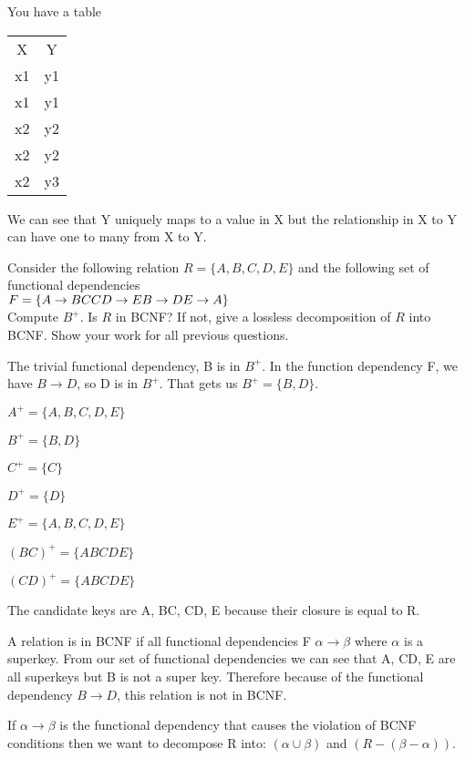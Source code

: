 \documentclass[a4 paper]{article}
\begin{document}
You have a table 

\begin{tabular}{c c}
    X & Y \\
    x1 & y1 \\
    x1 & y1 \\
    x2 & y2 \\
    x2 & y2 \\
    x2 & y3 \\
\end{tabular}

We can see that Y uniquely maps to a value in X but the relationship in X to Y can have one to many from X to Y.

Consider the following relation $R = \{A, B, C, D, E\}$ and the following set of functional dependencies \\$F = \{
\\A \rightarrow BC\\
CD \rightarrow E\\
B \rightarrow D\\
E \rightarrow A\}$\\
Compute $B^{+}$. Is $R$ in BCNF? If not, give a lossless decomposition of $R$ into BCNF. Show your work for all previous questions.

The trivial functional dependency, B is in $B^{+}$.
In the function dependency F, we have $B \rightarrow D$, so D is in $B^{+}$. 
That gets us $B^{+} = \{B,D\}$.

$A^{+} = \{A,B,C,D,E\}$

$B^{+} = \{B,D\}$

$C^{+} = \{C\}$

$D^{+} = \{D\}$

$E^{+} = \{A,B,C,D,E\}$

$(BC)^{+} = \{ABCDE\}$

$(CD)^{+} = \{ABCDE\}$

The candidate keys are A, BC, CD, E because their closure is equal to R.

A relation is in BCNF if all functional dependencies F $\alpha \rightarrow \beta$ where $\alpha$ is a superkey.
From our set of functional dependencies we can see that A, CD, E are all superkeys but B is not a super key.
Therefore because of the functional dependency $B \rightarrow D$, this relation is not in BCNF.

If $\alpha \rightarrow \beta$ is the functional dependency that causes the violation of BCNF conditions then we want to decompose R into:
$(\alpha \cup \beta)$ and $(R - (\beta - \alpha))$.
\end{document}
